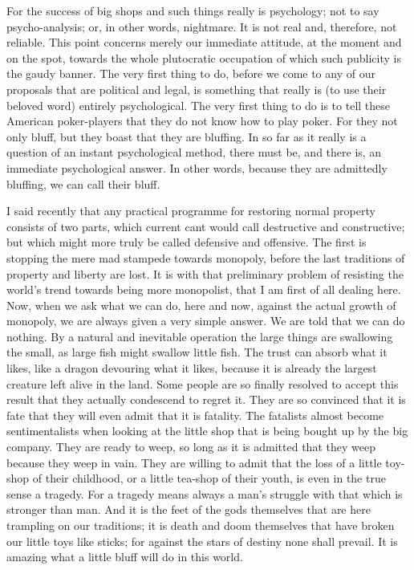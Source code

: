 \documentclass{book}
\begin{document}
For the success of big shops and such things really is psychology; not to say psycho-analysis; or, in other words, nightmare. It is not real and, therefore, not reliable. This point concerns merely our immediate attitude, at the moment and on the spot, towards the whole plutocratic occupation of which such publicity is the gaudy banner. The very first thing to do, before we come to any of our proposals that are political and legal, is something that really is (to use their beloved word) entirely psychological. The very first thing to do is to tell these American poker-players that they do not know how to play poker. For they not only bluff, but they boast that they are bluffing. In so far as it really is a question of an instant psychological method, there must be, and there is, an immediate psychological answer. In other words, because they are admittedly bluffing, we can call their bluff.

I said recently that any practical programme for restoring normal property consists of two parts, which current cant would call destructive and constructive; but which might more truly be called defensive and offensive. The first is stopping the mere mad stampede towards monopoly, before the last traditions of property and liberty are lost. It is with that preliminary problem of resisting the world’s trend towards being more monopolist, that I am first of all dealing here. Now, when we ask what we can do, here and now, against the actual growth of monopoly, we are always given a very simple answer. We are told that we can do nothing. By a natural and inevitable operation the large things are swallowing the small, as large fish might swallow little fish. The trust can absorb what it likes, like a dragon devouring what it likes, because it is already the largest creature left alive in the land. Some people are so finally resolved to accept this result that they actually condescend to regret it. They are so convinced that it is fate that they will even admit that it is fatality. The fatalists almost become sentimentalists when looking at the little shop that is being bought up by the big company. They are ready to weep, so long as it is admitted that they weep because they weep in vain. They are willing to admit that the loss of a little toy-shop of their childhood, or a little tea-shop of their youth, is even in the true sense a tragedy. For a tragedy means always a man’s struggle with that which is stronger than man. And it is the feet of the gods themselves that are here trampling on our traditions; it is death and doom themselves that have broken our little toys like sticks; for against the stars of destiny none shall prevail. It is amazing what a little bluff will do in this world.
\end{document}
